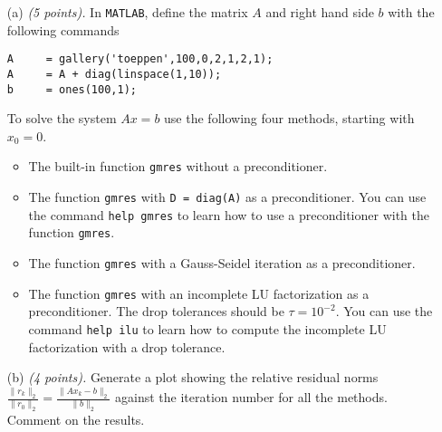 \documentclass[10pt]{report}
\begin{document}
\begin{enumerate}
\begin{itemize}
\item[(a)] \textit{(5 points).} In \verb+MATLAB+, define the matrix $A$ and right hand side $b$ with the following commands
\begin{verbatim}
A     = gallery('toeppen',100,0,2,1,2,1);
A     = A + diag(linspace(1,10));
b     = ones(100,1);
\end{verbatim}

To solve the system $Ax=b$ use the following four methods, starting with $x_0=0$.
 
\begin{itemize}
\item The built-in function \verb+gmres+ without a preconditioner.

\item The function \verb+gmres+ with \verb+D = diag(A)+ as a  preconditioner. You can use the command \verb+help gmres+ to learn how to use a preconditioner with the function \verb+gmres+.

\item The function \verb+gmres+ with a Gauss-Seidel iteration as a preconditioner.

\item The function \verb+gmres+ with an incomplete LU factorization as a preconditioner. 
The drop tolerances should be $\tau = 10^{-2}$. You can use the command \verb+help ilu+ to learn how to compute the incomplete LU factorization with a drop tolerance.
\end{itemize} 

\item[(b)] \textit{(4 points).} Generate a plot showing the relative residual norms $\frac{\|r_k\|_2}{\|r_0\|_2}=\frac{\|Ax_k-b\|_{2}}{\|b\|_2}$ against the iteration number for all the methods. Comment on the results. 

\end{itemize}

\end{enumerate}
\end{document}
